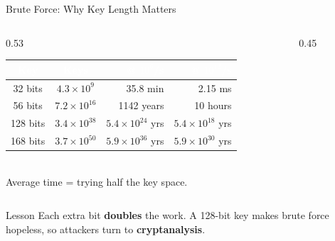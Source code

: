 \documentclass[aspectratio=169,11pt,xcolor={table}]{beamer}
\begin{document}
\begin{frame}{Brute Force: Why Key Length Matters}
  \begin{columns}[c]
    \begin{column}{0.53\textwidth}
      \renewcommand{\arraystretch}{1.3}
      \footnotesize
      \begin{tabular}{c c r r}
        \toprule
        \rowcolor{navy}\textcolor{white}{\textbf{Key}} & \textcolor{white}{\textbf{Keys}} & \textcolor{white}{\textbf{@ $10^6$/s}} & \textcolor{white}{\textbf{@ $10^{12}$/s}}\\
        \midrule
        32 bits  & $4.3\times10^{9}$  & 35.8 min & 2.15 ms\\
        56 bits  & $7.2\times10^{16}$ & 1142 years & 10 hours\\
        128 bits & $3.4\times10^{38}$ & $5.4\times10^{24}$ yrs & $5.4\times10^{18}$ yrs\\
        168 bits & $3.7\times10^{50}$ & $5.9\times10^{36}$ yrs & $5.9\times10^{30}$ yrs\\
        \bottomrule
      \end{tabular}\\[2mm]
      {\scriptsize Average time = trying half the key space.}
    \end{column}
    \begin{column}{0.45\textwidth}
      \centering
    \end{column}
  \end{columns}
  \vspace{3mm}
  \begin{block}{Lesson}
    \small Each extra bit \textbf{doubles} the work. A 128-bit key makes brute force hopeless, so attackers turn to \textbf{cryptanalysis}.
  \end{block}
\end{frame}
\end{document}
